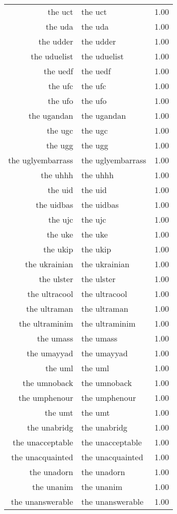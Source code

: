 \begin{table}[ht]
\begin{tabular}{rlr}
  the uct & the uct & 1.00 \\ 
  the uda & the uda & 1.00 \\ 
  the udder & the udder & 1.00 \\ 
  the uduelist & the uduelist & 1.00 \\ 
  the uedf & the uedf & 1.00 \\ 
  the ufc & the ufc & 1.00 \\ 
  the ufo & the ufo & 1.00 \\ 
  the ugandan & the ugandan & 1.00 \\ 
  the ugc & the ugc & 1.00 \\ 
  the ugg & the ugg & 1.00 \\ 
  the uglyembarrass & the uglyembarrass & 1.00 \\ 
  the uhhh & the uhhh & 1.00 \\ 
  the uid & the uid & 1.00 \\ 
  the uidbas & the uidbas & 1.00 \\ 
  the ujc & the ujc & 1.00 \\ 
  the uke & the uke & 1.00 \\ 
  the ukip & the ukip & 1.00 \\ 
  the ukrainian & the ukrainian & 1.00 \\ 
  the ulster & the ulster & 1.00 \\ 
  the ultracool & the ultracool & 1.00 \\ 
  the ultraman & the ultraman & 1.00 \\ 
  the ultraminim & the ultraminim & 1.00 \\ 
  the umass & the umass & 1.00 \\ 
  the umayyad & the umayyad & 1.00 \\ 
  the uml & the uml & 1.00 \\ 
  the umnoback & the umnoback & 1.00 \\ 
  the umphenour & the umphenour & 1.00 \\ 
  the umt & the umt & 1.00 \\ 
  the unabridg & the unabridg & 1.00 \\ 
  the unacceptable & the unacceptable & 1.00 \\ 
  the unacquainted & the unacquainted & 1.00 \\ 
  the unadorn & the unadorn & 1.00 \\ 
  the unanim & the unanim & 1.00 \\ 
  the unanswerable & the unanswerable & 1.00 \\ 

\end{tabular}
\end{table}
